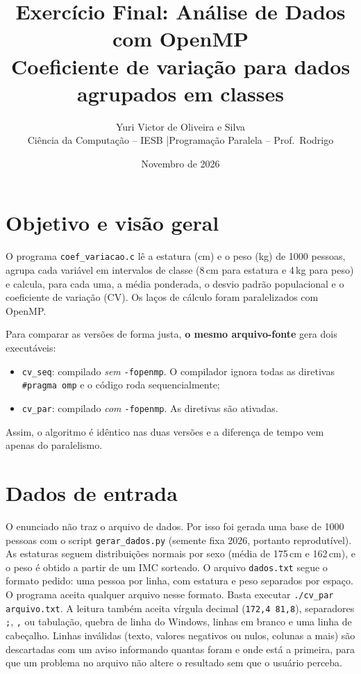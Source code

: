 \documentclass[11pt,a4paper]{article}
\title{\textbf{Exercício Final: Análise de Dados com OpenMP}\\[4pt]
\large Coeficiente de variação para dados agrupados em classes}
\author{Yuri Victor de Oliveira e Silva\\
\small Ciência da Computação -- IESB \quad|\quad Programação Paralela -- Prof.\ Rodrigo}
\date{Novembro de 2026}
\begin{document}
\renewcommand{\tablename}{Tabela}
\renewcommand{\figurename}{Figura}
\maketitle

\section{Objetivo e visão geral}

O programa \texttt{coef\_variacao.c} lê a estatura (cm) e o peso (kg) de 1000 pessoas,
agrupa cada variável em intervalos de classe (8\,cm para estatura e 4\,kg para peso) e calcula,
para cada uma, a média ponderada, o desvio padrão populacional e o coeficiente de variação (CV).
Os laços de cálculo foram paralelizados com OpenMP.

Para comparar as versões de forma justa, \textbf{o mesmo arquivo-fonte} gera dois executáveis:
\begin{itemize}
  \item \texttt{cv\_seq}: compilado \emph{sem} \texttt{-fopenmp}. O compilador ignora todas as diretivas
        \texttt{\#pragma omp} e o código roda sequencialmente;
  \item \texttt{cv\_par}: compilado \emph{com} \texttt{-fopenmp}. As diretivas são ativadas.
\end{itemize}
Assim, o algoritmo é idêntico nas duas versões e a diferença de tempo vem apenas do paralelismo.

\section{Dados de entrada}

O enunciado não traz o arquivo de dados. Por isso foi gerada uma base de 1000 pessoas com o script
\texttt{gerar\_dados.py} (semente fixa 2026, portanto reprodutível). As estaturas seguem distribuições normais
por sexo (média de 175\,cm e 162\,cm), e o peso é obtido a partir de um IMC sorteado. O arquivo
\texttt{dados.txt} segue o formato pedido: uma pessoa por linha, com estatura e peso separados por espaço.
O programa aceita qualquer arquivo nesse formato. Basta executar \texttt{./cv\_par arquivo.txt}.
A leitura também aceita vírgula decimal (\texttt{172,4 81,8}), separadores \texttt{;}, \texttt{,} ou tabulação,
quebra de linha do Windows, linhas em branco e uma linha de cabeçalho. Linhas inválidas (texto, valores
negativos ou nulos, colunas a mais) são descartadas com um aviso informando quantas foram e onde está a primeira,
para que um problema no arquivo não altere o resultado sem que o usuário perceba.
\end{document}
